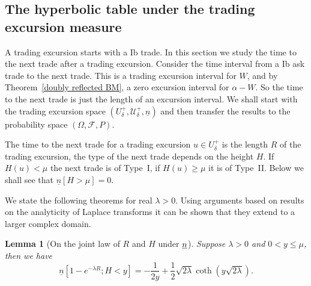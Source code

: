 \documentclass[11pt]{scrartcl}
\newtheorem{lemma}[theorem]{Lemma}
\begin{document}
\subsection{The hyperbolic table under the trading excursion measure}

A trading excursion starts with a Ib trade. In this section we study the
time to the next trade after a trading excursion. Consider the time interval
from a Ib ask trade to the next trade. This is a trading excursion interval for $W$, and by Theorem~\ref{doubly reflected BM}, a zero excursion interval
for $\alpha-W$. So the time to the next trade is just the length of an excursion interval. We shall start with the trading excursion space $(U_\delta^+,\mathcal{U}_\delta^+,\underline{n})$ and then transfer the results to the probability space $(\Omega,\mathcal{F},P)$.

The time to the next trade for a trading excursion $u\in U_\delta^+$
is the length $R$ of the trading excursion, the type of the next trade
depends on the height $H$. If $H(u)<\mu$ the next trade is of Type~{I}, if $H(u)\geq\mu$ it is of Type~{II}. Below we shall see that $\underline{n}[H>\mu]=0 $. 

We state the following theorems for real $\lambda>0$. 
Using arguments based on results on the analyticity of Laplace transforms it can be
shown that they extend to a larger complex domain.
\begin{lemma}[On the joint law of $R$ and $H$ under $\protect\underline{n}$]
\label{LapRH} Suppose $\lambda>0$ and $0<y\leq\mu$, then we have 
\begin{equation}\label{fhfh}
\underline{n}[1-e^{-\lambda R};H<y]= -\frac1{2y}+\frac12\sqrt{2\lambda}\coth(y\sqrt{2\lambda}).
\end{equation}
\end{lemma}
\end{document}
